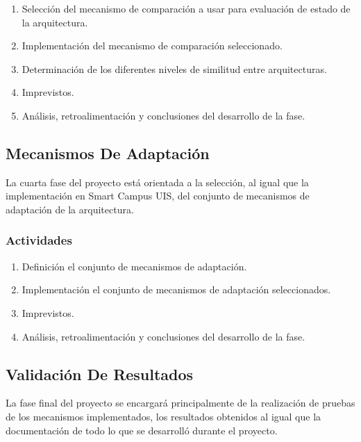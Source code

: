 \documentclass[12pt]{article}
\begin{document}
    \begin{enumerate}[label=\thesubsection.\arabic*., wide, labelindent=2em, leftmargin=5em]
        \item Selección del mecanismo de comparación a usar para evaluación de estado de la arquitectura.
        \item Implementación del mecanismo de comparación seleccionado.
        \item Determinación de los diferentes niveles de similitud entre arquitecturas.
        \item Imprevistos.
        \item Análisis, retroalimentación y conclusiones del desarrollo de la fase. 
    \end{enumerate}    

    \subsection{Mecanismos De Adaptación}
    
    La cuarta fase del proyecto está orientada a la selección, al igual que la implementación en Smart Campus UIS, del conjunto de mecanismos de adaptación de la arquitectura. 

    \subsubsection{Actividades}

   \begin{enumerate}[label=\thesubsection.\arabic*., wide, labelindent=2em, leftmargin=5em]
        \item Definición el conjunto de mecanismos de adaptación.
        \item Implementación el conjunto de mecanismos de adaptación seleccionados.
        \item Imprevistos.
        \item Análisis, retroalimentación y conclusiones del desarrollo de la fase. 
    \end{enumerate}  
    
    \subsection{Validación De Resultados}
    
    La fase final del proyecto se encargará principalmente de la realización de pruebas de los mecanismos implementados, los resultados obtenidos al igual que la documentación de todo lo que se desarrolló durante el proyecto.
    
\end{document}
